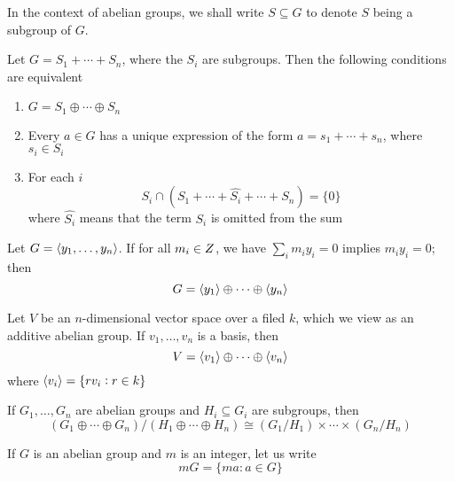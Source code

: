 \documentclass[11pt]{article}
\begin{document}
In the context of abelian groups, we shall write \(S\subseteq G\) to denote
\(S\) being a subgroup of \(G\).


\begin{proposition}[]
\label{prop5.4}
Let \(G=S_1+\cdots+S_n\), where the \(S_i\) are subgroups. Then the following
conditions are equivalent
\begin{enumerate}
\item \(G=S_1\oplus\cdots\oplus S_n\)
\item Every \(a\in G\) has a unique expression of the form
\(a=s_1+\cdots+s_n\), where \(s_i\in S_i\)
\item For each \(i\)
\begin{equation*}
S_i\cap(S_1+\cdots+\widehat{S_i}+\cdots+S_n)=\{0\}
\end{equation*}
where \(\widehat{S_i}\) means that the term \(S_i\) is omitted from the
sum
\end{enumerate}
\end{proposition}

\begin{corollary}[]
Let \(G=\langle y_1,\dots,y_n\rangle\). If for all \(m_i\in\relax{Z}\), we have
\(\sum_im_iy_i=0\) implies \(m_iy_i=0\); then
\begin{equation*}
G=\langle y_1\rangle\oplus\cdots\oplus\langle y_n\rangle
\end{equation*}
\end{corollary}

\begin{examplle}[]
Let \(V\) be an \(n\)-dimensional vector space over a filed \(k\), which we view
as an additive abelian group. If \(v_1,\dots,v_n\) is a basis, then
\begin{equation*}
V=\langle v_1\rangle\oplus\cdots\oplus\langle v_n\rangle
\end{equation*}
where \(\langle v_i\rangle=\{rv_i:r\in k\}\)
\end{examplle}

\begin{proposition}[]
\label{prop5.7}
\label{nprop1.85}
If \(G_1,\dots,G_n\) are abelian groups and \(H_i\subseteq G_i\) are
subgroups, then
\begin{equation*}
(G_1\oplus\cdots\oplus G_n)/(H_1\oplus\cdots\oplus H_n)\cong(G_1/H_1)
\times\cdots\times(G_n/H_n)
\end{equation*}
\end{proposition}

If \(G\) is an abelian group and \(m\) is an integer, let us write
\begin{equation*}
mG=\{ma:a\in G\}
\end{equation*}
\end{document}
